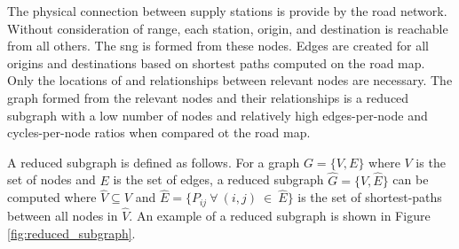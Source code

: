 The physical connection between supply stations is provide by the road network. Without consideration of range, each station, origin, and destination is reachable from all others. The \gls{sng} is formed from these nodes. Edges are created for all origins and destinations based on shortest paths computed on the road map. Only the locations of and relationships between relevant nodes are necessary. The graph formed from the relevant nodes and their relationships is a reduced subgraph with a low number of nodes and relatively high edges-per-node and cycles-per-node ratios when compared ot the road map.

A reduced subgraph is defined as follows. For a graph $G = \{V, E\}$ where $V$ is the set of nodes and $E$ is the set of edges, a reduced subgraph $\hat{G} = \{\hat{V}, \hat{E}\}$ can be computed where $\hat{V} \subseteq V$ and $\hat{E} = \{P_{ij}\ \forall\ (i, j)\ \in\ \hat{E}\}$ is the set of shortest-paths between all nodes in $\hat{V}$. An example of a reduced subgraph is shown in Figure \ref{fig:reduced_subgraph}.

